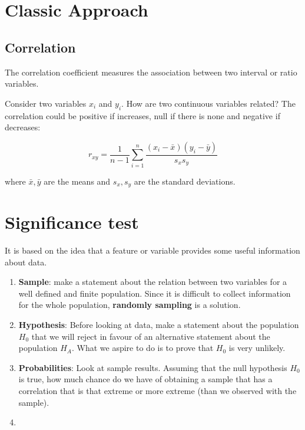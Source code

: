 \documentclass[
  notitlepage,
  onecolumn,
  openany]{book}
\providecommand{\tightlist}{%
  \setlength{\itemsep}{0pt}\setlength{\parskip}{0pt}}
\begin{document}
\hypertarget{classic-approach}{%
\section{Classic Approach}\label{classic-approach}}

\hypertarget{correlation}{%
\subsection{Correlation}\label{correlation}}

The correlation coefficient measures the association between two interval or ratio variables.

Consider two variables \(x_i\) and \(y_i\). How are two continuous variables related? The correlation could be positive if increases, null if there is none and negative if decreases:

\[
r_{xy} = \frac{1}{n-1}\sum^n_{i=1} \frac{(x_i-\bar{x})(y_i-\bar{y})}{s_xs_y}
\]

where \(\bar{x}, \bar{y}\) are the means and \(s_x,s_y\) are the standard deviations.

\hypertarget{significance-test}{%
\section{Significance test}\label{significance-test}}

It is based on the idea that a feature or variable provides some useful information about data.

\begin{enumerate}
\def\labelenumi{\arabic{enumi}.}
\item
  \textbf{Sample}: make a statement about the relation between two variables for a well defined and finite population. Since it is difficult to collect information for the whole population, \textbf{randomly sampling} is a solution.
\item
  \textbf{Hypothesis}: Before looking at data, make a statement about the population \(H_0\) that we will reject in favour of an alternative statement about the population \(H_A\). What we aspire to do is to prove that \(H_0\) is very unlikely.
\item
  \textbf{Probabilities}: Look at sample results. Assuming that the null hypothesis \(H_0\) is true, how much chance do we have of obtaining a sample that has a correlation that is that extreme or more extreme (than we observed with the sample).
\item
\end{enumerate}
\end{document}
